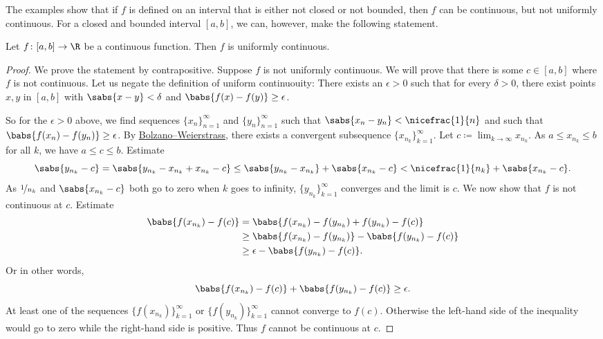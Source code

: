 The examples show that if $f$ is defined on an interval that is either not closed
or not bounded, then $f$ can be continuous, but not uniformly continuous.
For a closed and bounded interval $[a,b]$, we can, however,
make the following statement.

\begin{thm} \label{unifcont:thm}
Let $f \colon [a,b] \to \R$ be a continuous function.  Then $f$
is uniformly continuous.
\end{thm}

\begin{proof}
We prove the statement by contrapositive.
Suppose $f$ is not uniformly continuous.  We will prove
that there is some
$c \in [a,b]$ where $f$ is not continuous.  Let us negate
the definition of uniform continuouity:
There exists an $\epsilon > 0$
such that for every $\delta > 0$, there exist points $x, y$ in $[a,b]$ with
$\sabs{x-y} < \delta$ and $\babs{f(x)-f(y)} \geq \epsilon$.

So for the $\epsilon > 0$ above,
we find sequences $\{ x_n \}_{n=1}^\infty$ and $\{ y_n \}_{n=1}^\infty$ such that
$\sabs{x_n-y_n} < \nicefrac{1}{n}$ and such that $\babs{f(x_n)-f(y_n)} \geq
\epsilon$.  By
\hyperref[thm:bwseq]{Bolzano--Weierstrass},
there exists a convergent subsequence
$\{ x_{n_k} \}_{k=1}^\infty$.  Let $c \coloneqq \lim_{k\to\infty} x_{n_k}$.
As $a \leq x_{n_k} \leq b$ for all $k$, we have $a \leq c \leq b$.  Estimate
\begin{equation*}
\sabs{y_{n_k} - c} =
\sabs{y_{n_k} - x_{n_k} + x_{n_k} - c} \leq
\sabs{y_{n_k} - x_{n_k}}
+
\sabs{x_{n_k}-c}
<
\nicefrac{1}{n_k} 
+
\sabs{x_{n_k}-c} .
\end{equation*}
As $\nicefrac{1}{n_k}$ and $\sabs{x_{n_k}-c}$ both go to zero when
$k$ goes to infinity, $\{ y_{n_k} \}_{k=1}^\infty$ converges and the limit
is $c$.  We now show that $f$ is not continuous at $c$.
Estimate
\begin{equation*}
\begin{split}
\babs{f(x_{n_k}) - f(c)} & =
\babs{f(x_{n_k}) - f(y_{n_k}) + f(y_{n_k}) - f(c)} \\
& \geq
\babs{f(x_{n_k}) - f(y_{n_k})} - \babs{f(y_{n_k}) - f(c)} \\
& \geq
\epsilon - \babs{f(y_{n_k})-f(c)} .
\end{split}
\end{equation*}
Or in other words,
\begin{equation*}
\babs{f(x_{n_k})-f(c)} 
+
\babs{f(y_{n_k})-f(c)}  \geq
\epsilon .
\end{equation*}
At least one of the sequences $\bigl\{ f(x_{n_k}) \bigr\}_{k=1}^\infty$  or
$\bigl\{ f(y_{n_k}) \bigr\}_{k=1}^\infty$ cannot converge to $f(c)$.
Otherwise the
left-hand side of the inequality would go to zero while the right-hand side is positive.
Thus $f$ cannot be continuous at $c$.
\end{proof}

